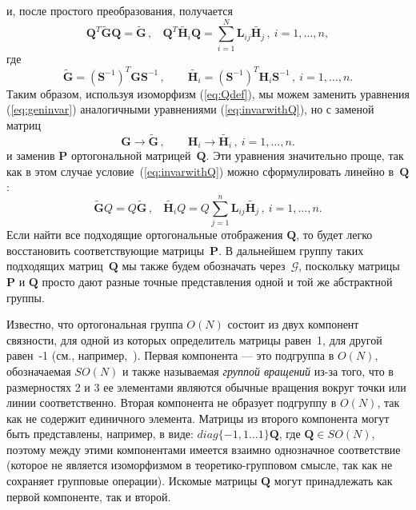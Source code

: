 {и, после простого преобразования, получается
%
\begin{equation}
\label{eq:invarwithQ}
\textbf{Q}^T \tilde{\textbf{G}} \textbf{Q}=\tilde{\textbf{G}} \,  , \ \ \ \
\textbf{Q}^T \tilde{\textbf{H}_i} \textbf{Q}= \sum_{i=1}^N \textbf{L}_{ij}\tilde{\textbf{H}_j} \, , \ i=1,\dots,n,
\end{equation}
%
где
%
\begin{equation}
\tilde{\textbf{G}}=\left(\textbf{S}^{-1}\right)^T \textbf{G} \textbf{S}^{-1} \, , \qquad
\tilde{\textbf{H}_i}=\left(\textbf{S}^{-1}\right)^T \textbf{H}_i \textbf{S}^{-1} \, , \ i=1,\dots,n.
\end{equation}
%
Таким образом, используя изоморфизм (\ref{eq:Qdef}), мы можем заменить уравнения (\ref{eq:geninvar}) аналогичными уравнениями (\ref{eq:invarwithQ}), но с заменой матриц
\begin{equation}
\label{eq:totilde}
\textbf{G} \to \tilde{\textbf{G}} \, , \qquad \textbf{H}_i \to \tilde{\textbf{H}_i}\, , \ i=1,\dots,n.
\end{equation}
%
и заменив $\textbf{P}$ ортогональной матрицей~$\textbf{Q}$. Эти уравнения значительно проще, так как в этом случае условие~(\ref{eq:invarwithQ}) можно сформулировать линейно в~$\textbf{Q}$:
%
\begin{equation}
\label{eq:comutatinvarwithQ}
\tilde{\textbf{G}} Q=Q\tilde{\textbf{G}} \,  , \ \ \ \
\tilde{\textbf{H}_i} Q= Q\sum_{j=1}^n \textbf{L}_{ij}\tilde{\textbf{H}_j} \, , \  i=1,\dots,n.
\end{equation}
%
Если найти все подходящие ортогональные отображения $\textbf{Q}$, то будет легко восстановить соответствующие матрицы~$\textbf{P}$. В дальнейшем группу таких подходящих матриц~$\textbf{Q}$ мы также будем обозначать через~$\mathcal{G}$, поскольку матрицы~$\textbf{P}$ и $\textbf{Q}$ просто дают разные {точные} представления одной и той же абстрактной группы.

Известно, что ортогональная группа $O(N)$ состоит из двух компонент связности, для одной из которых определитель матрицы равен~1, для другой равен~-1 (см., например,~\cite{Zhelobenko}). Первая компонента — это подгруппа в $O(N)$, обозначаемая $SO(N)$ и также называемая {\em группой вращений} из-за того, что в размерностях 2 и 3 ее элементами являются обычные вращения вокруг точки или линии соответственно. Вторая компонента не образует подгруппу в $O(N)$, так как не содержит единичного элемента. Матрицы из второго компонента могут быть представлены, например, в виде: $ {diag} \{- 1,1 \dots 1 \} \textbf{Q} $, где $ \textbf{Q} \in SO(N) $, поэтому между этими компонентами имеется взаимно однозначное соответствие (которое не является изоморфизмом в теоретико-групповом смысле, так как не сохраняет групповые операции). Искомые матрицы $\textbf{Q}$ могут принадлежать как первой компоненте, так и второй.

}
